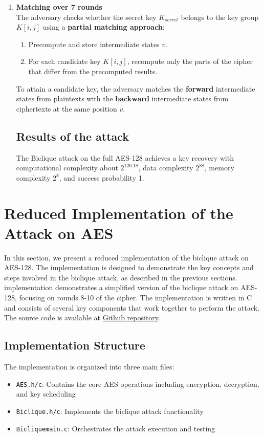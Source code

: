 \documentclass{report}
\begin{document}
\begin{enumerate}[start = 1, label={(\bfseries Step\arabic*):}]
 \item \textbf{Matching over 7 rounds}\\The adversary checks whether the secret key $K_{secret}$ belongs to the key group $K[i, j]$ using a \textbf{partial matching approach}:

 \begin{enumerate}
     \item Precompute and store intermediate states $v$.
     \item For each candidate key $K[i,j]$, recompute only the parts of the cipher that differ from the precomputed results.
 \end{enumerate}
 
 To attain a candidate key, the adversary matches the \textbf{forward} intermediate states from plaintexts with the \textbf{backward} intermediate states from ciphertexts at the same position $v$.
 
 \subsection{Results of the attack}
 The Biclique attack on the full AES-128 achieves a key recovery with computational complexity about $2^{126.18}$, data complexity $2^{88}$, memory complexity $2^8$, and success probability 1.
 
 \end{enumerate}

 \section{Reduced Implementation of the Attack on AES}
 In this section, we present a reduced implementation of the biclique attack on AES-128. The implementation is designed to demonstrate the key concepts and steps involved in the biclique attack, as described in the previous sections. implementation demonstrates a simplified version of the biclique attack on AES-128, focusing on rounds 8-10 of the cipher. The implementation is written in C and consists of several key components that work together to perform the attack.
 The source code is available at \href{https://github.com/MortazaHassani/Biclique-Attack-on-AES-128/}{Github repository}. 
 \subsection{Implementation Structure}
The implementation is organized into three main files:
\begin{itemize}
    \item \texttt{AES.h/c}: Contains the core AES operations including encryption, decryption, and key scheduling
    \item \texttt{Biclique.h/c}: Implements the biclique attack functionality
    \item \texttt{Bicliquemain.c}: Orchestrates the attack execution and testing
\end{itemize}
\end{document}
